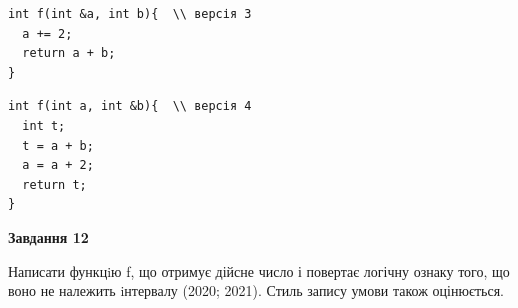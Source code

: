 \documentclass[12pt, ukrainian]{article}
\begin{document}
{\begin {large}
\begin{minipage}[t]{11.0cm}
\vspace{-8mm}\begin{verbatim}
int f(int &a, int b){  \\ версія 3
  a += 2;
  return a + b;
}
\end{verbatim}

\vspace{-8mm}\begin{verbatim}
int f(int a, int &b){  \\ версія 4
  int t;
  t = a + b;
  a = a + 2;
  return t;
}
\end{verbatim}



\begin{center}
\textbf{Завдання 12}
\end{center}

Написати функцiю f, що отримує дійсне число і повертає логічну ознаку того, що воно не належить iнтервалу (2020; 2021). Стиль запису умови також оцінюється.\par

\end{minipage}

\end {large}}
\newpage
\end{document}
